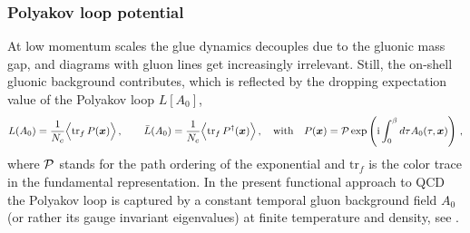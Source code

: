 \documentclass[reprint,twocolumn,superscriptaddress,preprintnumbers,amsmath,amssymb,aps,prd,floatfix]{revtex4-2}
\newcommand{\tr}{{\text{tr}}}
\newcommand{\imag}{\text{i}}
\begin{document}
\subsubsection{Polyakov loop potential}
\label{app:PolPot}

At low momentum scales the glue dynamics decouples due to the gluonic mass gap, and diagrams with gluon lines get increasingly irrelevant. Still, the on-shell gluonic background contributes, which is reflected by the dropping expectation value of the Polyakov loop $L[A_0]$,  
%
\begin{align} 
    L(A_0)=\frac{1}{N_c} \Big\langle \tr_f\, P(\bm x)\Big\rangle\,,  \qquad \bar L(A_0)=\frac{1}{N_c} \Big\langle \tr_f\, P^\dagger(\bm x)\Big\rangle\,, \quad \textrm{with} \quad P(\bm x) ={\cal P} \exp \left(\imag \int_0^\beta d\tau A_0(\tau,\bm x)\right)\,, \label{eq:DefofLbarL}
\end{align}
%
where ${\cal P}$ stands for the path ordering of the exponential and $\tr_f$ is the color trace in the fundamental representation. In the present functional approach to QCD the Polyakov loop is captured by a constant temporal gluon background field $A_0$ (or rather its gauge invariant eigenvalues) at finite temperature and density, 
see \cite{Braun:2007bx, Fister:2013bh}. 
\end{document}
